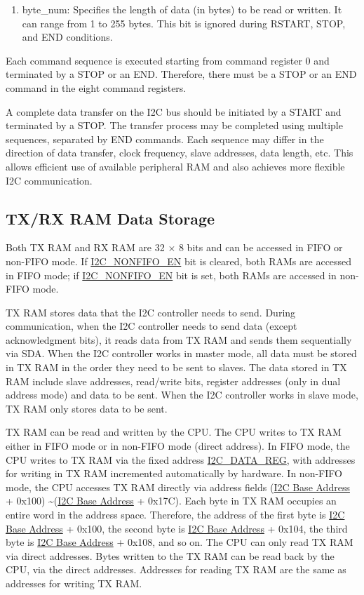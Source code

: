 \documentclass[main\_\_EN.tex]{subfiles}
\begin{document}
\begin{enumerate}
\item byte\_num: Specifies the length of data (in bytes) to be read or written. It can range from 1 to 255 bytes. This bit is ignored during RSTART, STOP, and END conditions.
\end{enumerate}

Each command sequence is executed starting from command register 0 and terminated by a STOP or an END. Therefore, there must be a STOP or an END command in the eight command registers.

A complete data transfer on the I2C bus should be initiated by a START and terminated by a STOP. The transfer process may be completed using multiple sequences, separated by END commands. Each sequence may differ in the direction of data transfer, clock frequency, slave addresses, data length, etc. This allows efficient use of available peripheral RAM and also achieves more flexible I2C communication.

\subsection{TX/RX RAM Data Storage}
\label{subsubsec:i2c-txrx}

Both TX RAM and RX RAM are 32 × 8 bits and can be accessed in FIFO or non-FIFO mode. If \hyperref[fielddesc:I2CNONFIFOEN]{I2C\_NONFIFO\_EN} bit is cleared, both RAMs are accessed in FIFO mode; if \hyperref[fielddesc:I2CNONFIFOEN]{I2C\_NONFIFO\_EN} bit is set, both RAMs are accessed in non-FIFO mode.

TX RAM stores data that the I2C controller needs to send. During communication, when the I2C controller needs to send data (except acknowledgment bits), it reads data from TX RAM and sends them sequentially via SDA. When the I2C controller works in master mode, all data must be stored in TX RAM in the order they need to be sent to slaves. The data stored in TX RAM include slave addresses, read/write bits, register addresses (only in dual address mode) and data to be sent. When the I2C controller works in slave mode, TX RAM only stores data to be sent.

TX RAM can be read and written by the CPU. The CPU writes to TX RAM either in FIFO mode or in non-FIFO mode (direct address). In FIFO mode, the CPU writes to TX RAM via the fixed address \hyperref[regdesc:I2CDATAREG]{I2C\_DATA\_REG}, with addresses for writing in TX RAM incremented automatically by hardware. In non-FIFO mode, the CPU accesses TX RAM directly via address fields (\hyperref[tab:sysmem-base-address]{I2C Base Address} + 0x100) \textasciitilde (\hyperref[tab:sysmem-base-address]{I2C Base Address} + 0x17C). Each byte in TX RAM occupies an entire word in the address space. Therefore, the address of the first byte is \hyperref[tab:sysmem-base-address]{I2C Base Address} + 0x100, the second byte is \hyperref[tab:sysmem-base-address]{I2C Base Address} + 0x104, the third byte is \hyperref[tab:sysmem-base-address]{I2C Base Address} + 0x108, and so on. The CPU can only read TX RAM via direct addresses. Bytes written to the TX RAM can be read back by the CPU, via the direct addresses. Addresses for reading TX RAM are the same as addresses for writing TX RAM.
\end{document}
